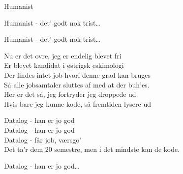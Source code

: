 \begin{song}{Humanist}
  \begin{SBChorus}
    Humanist - det' godt nok trist\ldots
  \end{SBChorus}

  \begin{SBChorus}
    Humanist - det' godt nok trist\ldots
  \end{SBChorus}

  \begin{SBVerse}
    Nu er det ovre, jeg er endelig blevet fri\\
    Er blevet kandidat i østrigsk eskimologi\\
    Der findes intet job hvori denne grad kan bruges\\
    Så alle jobsamtaler sluttes af med at der buh'es.\\
    Her er det så, jeg fortryder jeg droppede ud\\
    Hvis bare jeg kunne kode, så fremtiden lysere ud
  \end{SBVerse}

  \begin{SBChorus}
    Datalog - han er jo god\\
    Datalog - han er jo god\\
    Datalog - får job, værsgo'\\
    Det ta'r dem 20 semestre, men i det mindste kan de kode.
  \end{SBChorus}

  \begin{SBChorus}
    Datalog - han er jo god\ldots
  \end{SBChorus}
\end{song}
